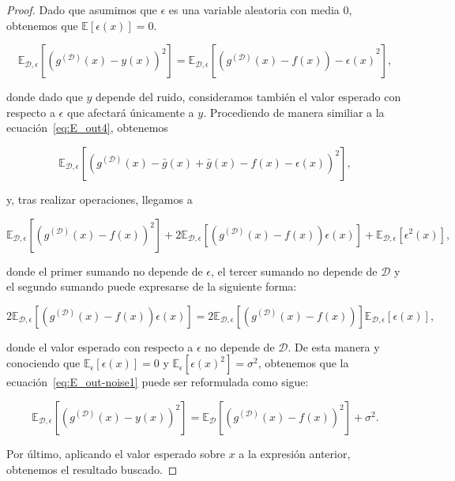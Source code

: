 \begin{proof}
    Dado que asumimos que $\epsilon$ es una variable aleatoria con media $0$, obtenemos que $\mathbb{E}[\epsilon(x)] = 0$.

    \begin{equation}\label{eq:E_out-noise1}
        \mathbb{E}_{\mathcal{D}, \epsilon}[{(g^{\mathcal{(D)}}(x) - y(x))}^2] = \mathbb{E}_{\mathcal{D}, \epsilon}[{(g^{\mathcal{(D)}}(x) - f(x)) - \epsilon(x)}^2],
    \end{equation}

    donde dado que $y$ depende del ruido, consideramos también el valor esperado con respecto a $\epsilon$ que afectará únicamente a $y$. Procediendo de manera similiar a la ecuación~\eqref{eq:E_out4}, obtenemos

    \begin{equation}
        \mathbb{E}_{\mathcal{D}, \epsilon}[{(g^{\mathcal{(D)}}(x) - \bar{g}(x) + \bar{g}(x) - f(x) - \epsilon(x))}^2],
    \end{equation}

    y, tras realizar operaciones, llegamos a

    \begin{equation}
        \mathbb{E}_{\mathcal{D}, \epsilon}[{(g^{\mathcal{(D)}}(x) - f(x))}^2] + 2\mathbb{E}_{\mathcal{D}, \epsilon}[(g^{\mathcal{(D)}}(x)-f(x))\epsilon(x)] + \mathbb{E}_{\mathcal{D}, \epsilon}[\epsilon^{2}(x)],
    \end{equation}

    donde el primer sumando no depende de $\epsilon$, el tercer sumando no depende de $\mathcal{D}$ y el segundo sumando puede expresarse de la siguiente forma:

    \begin{equation}
        2\mathbb{E}_{\mathcal{D}, \epsilon}[(g^{\mathcal{(D)}}(x)-f(x))\epsilon(x)] = 2\mathbb{E}_{\mathcal{D}, \epsilon}[(g^{\mathcal{(D)}}(x)-f(x))]\mathbb{E}_{\mathcal{D}, \epsilon}[\epsilon(x)],
    \end{equation}

    donde el valor esperado con respecto a $\epsilon$ no depende de $\mathcal{D}$. De esta manera y conociendo que $\mathbb{E}_{\epsilon}[\epsilon(x)] = 0$ y $\mathbb{E}_{\epsilon}[{\epsilon(x)}^{2}] = \sigma^{2}$, obtenemos que la ecuación~\eqref{eq:E_out-noise1} puede ser reformulada como sigue:

    \begin{equation}
        \mathbb{E}_{\mathcal{D}, \epsilon}[{(g^{\mathcal{(D)}}(x) - y(x))}^2] = \mathbb{E}_{\mathcal{D}}[{(g^{\mathcal{(D)}}(x) - f(x))}^2] + \sigma^{2}.
    \end{equation}

    Por último, aplicando el valor esperado sobre $x$ a la expresión anterior, obtenemos el resultado buscado.
\end{proof}

